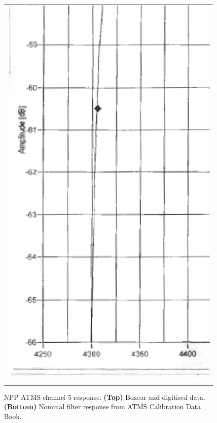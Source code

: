 \begin{figure}[H]
\begin{tabular}{c}
    \includegraphics[bb=249 194 1431 1035,scale=0.3]{graphics/log_book/ch5.eps}
  \end{tabular}
  \caption{NPP ATMS channel 5 response. \textbf{(Top)} Boxcar and digitised data. \textbf{(Bottom)} Nominal filter response from ATMS Calibration Data Book\cite{ATMS_PFM_CalLog}.}
  \label{fig:atms_npp.ch5.srf}
\end{figure}

